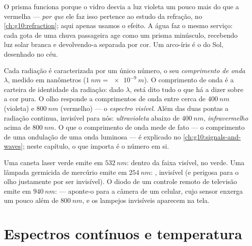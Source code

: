 \begin{remark}\label{rem:g10:light-spectra:rainbow}
O prisma funciona porque o vidro desvia a luz violeta um pouco mais do que a
vermelha --- \emph{por que} ele faz isso pertence ao estudo da refração, no
\cref{ch:g10:refraction}; aqui apenas usamos o efeito. A água faz o mesmo
serviço: cada gota de uma chuva passageira age como um prisma minúsculo,
recebendo luz solar branca e devolvendo-a separada por cor. Um arco-íris é o
 do Sol, desenhado no céu.
\end{remark}

\begin{definition}\label{def:g10:light-spectra:wavelength}
Cada radiação  é caracterizada por um único número, o seu
\emph{comprimento de onda} $\lambda$, medido em
nanômetros ($\qty{1}{nm} = \qty{e-9}{m}$). O comprimento de onda é a
carteira de identidade da radiação: dado $\lambda$, está dito tudo o que há
a dizer sobre a cor pura. O olho responde a comprimentos de onda entre cerca
de $\qty{400}{nm}$ (violeta) e $\qty{800}{nm}$ (vermelho) --- o
\emph{espectro visível}. Além das duas pontas a
radiação continua, invisível para nós: \emph{ultravioleta}
abaixo de $\qty{400}{nm}$, \emph{infravermelho} acima de
$\qty{800}{nm}$. O que o comprimento de onda mede de fato --- o comprimento
de uma ondulação de uma onda luminosa --- é explicado no
\cref{ch:g10:signals-and-waves}; neste capítulo, o que importa é o número em
si.
\end{definition}

\begin{example}\label{ex:g10:light-spectra:classify}
Uma caneta laser verde emite em $\qty{532}{nm}$: dentro da faixa visível, no
verde. Uma lâmpada germicida de mercúrio emite em $\qty{254}{nm}$:
, invisível (e perigosa para o olho justamente por ser
invisível). O diodo de um controle remoto de televisão emite em
$\qty{940}{nm}$:  --- aponte-o para a câmera de um celular,
cujo sensor enxerga um pouco além de $\qty{800}{nm}$, e os lampejos
invisíveis aparecem na tela.
\end{example}

\section{Espectros contínuos e temperatura}

